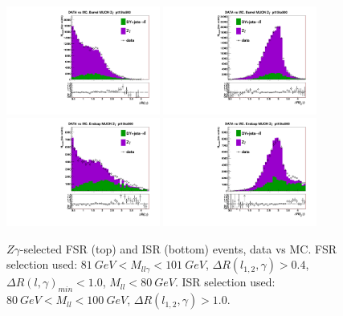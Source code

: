 \begin{figure}[htb]
  \begin{center}
   \includegraphics[width=0.45\textwidth]{../figs/figs_v11/MUON_ZGamma/PrepareYields/c_TotalDATAvsMC_Barrel__lep1PhoDeltaRVERY_PRELIMINARY_pt15to500_.pdf}   \includegraphics[width=0.45\textwidth]{../figs/figs_v11/MUON_ZGamma/PrepareYields/c_TotalDATAvsMC_Barrel__lep2PhoDeltaRVERY_PRELIMINARY_pt15to500_.pdf}\\
\includegraphics[width=0.45\textwidth]{../figs/figs_v11/MUON_ZGamma/PrepareYields/c_TotalDATAvsMC_Endcap__lep1PhoDeltaRVERY_PRELIMINARY_pt15to500_.pdf}   \includegraphics[width=0.45\textwidth]{../figs/figs_v11/MUON_ZGamma/PrepareYields/c_TotalDATAvsMC_Endcap__lep2PhoDeltaRVERY_PRELIMINARY_pt15to500_.pdf}    \\
  \caption{$Z\gamma$-selected FSR (top) and ISR (bottom) events, data vs MC. FSR selection used: $81~GeV<M_{ll\gamma}<101~GeV$, $\Delta{R}(l_{1,2},\gamma)>0.4$, $\Delta{R}(l,\gamma)_{min}<1.0$, $M_{ll}<80~GeV$. ISR selection used: $80~GeV<M_{ll}<100~GeV$, $\Delta{R}(l_{1,2},\gamma)>1.0$.}
  \label{fig:Zg_ISRandFSR_dR}
  \end{center}
\end{figure}

